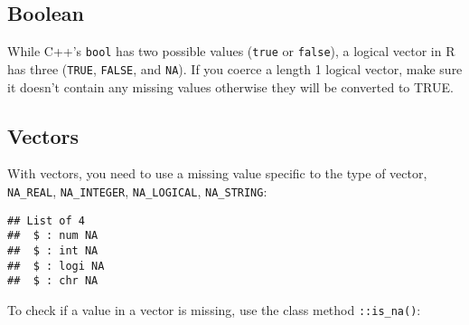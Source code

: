 \hypertarget{boolean}{%
\subsection{Boolean}\label{boolean}}

While C++'s \texttt{bool} has two possible values (\texttt{true} or
\texttt{false}), a logical vector in R has three (\texttt{TRUE},
\texttt{FALSE}, and \texttt{NA}). If you coerce a length 1 logical
vector, make sure it doesn't contain any missing values otherwise they
will be converted to TRUE.

\hypertarget{vectors-rcpp}{%
\subsection{Vectors}\label{vectors-rcpp}}

With vectors, you need to use a missing value specific to the type of
vector, \texttt{NA\_REAL}, \texttt{NA\_INTEGER}, \texttt{NA\_LOGICAL},
\texttt{NA\_STRING}:

\begin{Shaded}
\begin{Highlighting}[]
 

\NormalTok{\}}
\end{Highlighting}
\end{Shaded}

\begin{Shaded}
\begin{Highlighting}[]
\NormalTok{(}\NormalTok{())}
\end{Highlighting}
\end{Shaded}

\begin{verbatim}
## List of 4
##  $ : num NA
##  $ : int NA
##  $ : logi NA
##  $ : chr NA
\end{verbatim}

To check if a value in a vector is missing, use the class method
\texttt{::is\_na()}:

